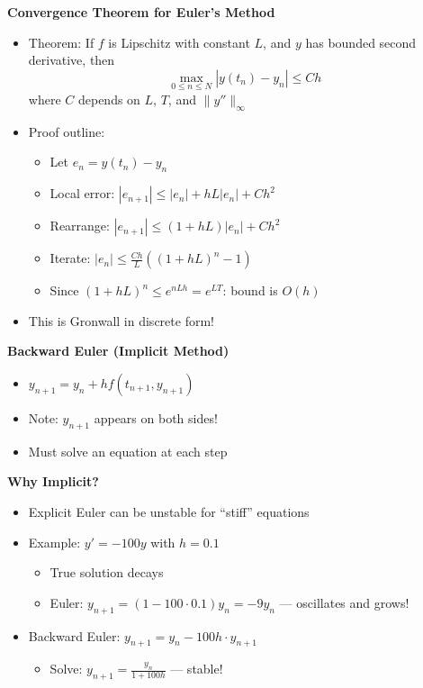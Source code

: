 \documentclass[
  10pt,
  letterpaper,
]{scrbook}
\providecommand{\tightlist}{%
  \setlength{\itemsep}{0pt}\setlength{\parskip}{0pt}}
\begin{document}
\textbf{Convergence Theorem for Euler's Method}

\begin{itemize}
\tightlist
\item
  Theorem: If \(f\) is Lipschitz with constant \(L\), and \(y\) has
  bounded second derivative, then
  \[\max_{0 \leq n \leq N} |y(t_n) - y_n| \leq Ch\] where \(C\) depends
  on \(L\), \(T\), and \(\|y''\|_\infty\)
\item
  Proof outline:

  \begin{itemize}
  \tightlist
  \item
    Let \(e_n = y(t_n) - y_n\)
  \item
    Local error: \(|e_{n+1}| \leq |e_n| + hL|e_n| + Ch^2\)
  \item
    Rearrange: \(|e_{n+1}| \leq (1 + hL)|e_n| + Ch^2\)
  \item
    Iterate: \(|e_n| \leq \frac{C h}{L}((1 + hL)^n - 1)\)
  \item
    Since \((1 + hL)^n \leq e^{nLh} = e^{LT}\): bound is \(O(h)\)
  \end{itemize}
\item
  This is Gronwall in discrete form!
\end{itemize}

\textbf{Backward Euler (Implicit Method)}

\begin{itemize}
\tightlist
\item
  \(y_{n+1} = y_n + hf(t_{n+1}, y_{n+1})\)
\item
  Note: \(y_{n+1}\) appears on both sides!
\item
  Must solve an equation at each step
\end{itemize}

\textbf{Why Implicit?}

\begin{itemize}
\tightlist
\item
  Explicit Euler can be unstable for ``stiff'' equations
\item
  Example: \(y' = -100y\) with \(h = 0.1\)

  \begin{itemize}
  \tightlist
  \item
    True solution decays
  \item
    Euler: \(y_{n+1} = (1 - 100 \cdot 0.1)y_n = -9y_n\) --- oscillates
    and grows!
  \end{itemize}
\item
  Backward Euler: \(y_{n+1} = y_n - 100h \cdot y_{n+1}\)

  \begin{itemize}
  \tightlist
  \item
    Solve: \(y_{n+1} = \frac{y_n}{1 + 100h}\) --- stable!
  \end{itemize}
\end{itemize}
\end{document}
